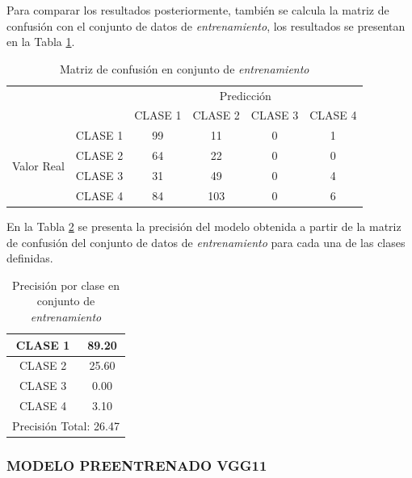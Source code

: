 Para comparar los resultados posteriormente, también se calcula la matriz de confusión con el conjunto de datos de \textit{entrenamiento}, los resultados se presentan en la Tabla \ref{fig:MC_VGG19_2}.

\begin{table}[htbp]
	\centering
	\resizebox{12cm}{!} {
		\begin{tabular}{|c|l|c|c|c|c|}
			\hline
			\multicolumn{2}{|c|}{\multirow{2}[4]{*}{}} & \multicolumn{4}{c|}{Predicción} \bigstrut\\
			\cline{3-6}    \multicolumn{2}{|c|}{} & CLASE 1 & CLASE 2 & CLASE 3 & CLASE 4 \bigstrut\\
			\hline
			\multirow{4}[8]{*}{\begin{sideways}Valor Real\end{sideways}} & CLASE 1 & 99     & 11     & 0    & 1 \bigstrut\\
			\cline{2-6}     & CLASE 2 & 64     & 22     & 0    & 0 \bigstrut\\
			\cline{2-6}      & CLASE 3 & 31     & 49     & 0    & 4 \bigstrut\\
			\cline{2-6}     & CLASE 4 & 84     & 103     & 0    & 6 \bigstrut\\
			\hline
		\end{tabular}
	}
	\caption{Matriz de confusión en conjunto de \textit{entrenamiento}}
	\label{fig:MC_VGG19_2}
\end{table}

En la Tabla \ref{fig:ACU_VGG19_2} se presenta la precisión del modelo obtenida a partir de la matriz de confusión del conjunto de datos de \textit{entrenamiento} para cada una de las clases definidas.

\begin{table}[htbp]
	\centering
	\begin{tabular}{|c|c|}
		\hline
		CLASE 1 & 89.20 \bigstrut\\
		\hline
		CLASE 2 & 25.60 \bigstrut\\
		\hline
		CLASE 3 & 0.00 \bigstrut\\
		\hline
		CLASE 4 & 3.10 \bigstrut\\
		\hline
		\multicolumn{2}{|c|}{Precisión Total: 26.47} \bigstrut\\
		\hline
	\end{tabular}%
	\caption{Precisión por clase en conjunto de \textit{entrenamiento}}
	\label{fig:ACU_VGG19_2}
\end{table}

\newpage
\subsubsection{\MakeUppercase{Modelo preentrenado VGG11}}

